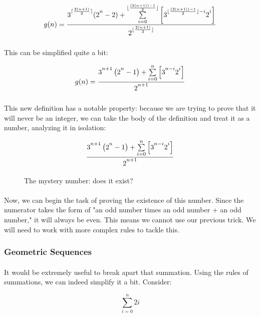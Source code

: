 \documentclass[12pt,letterpaper]{article}
\begin{document}
			\begin{equation*}
				g(n) = \frac{3\strut^{\lceil \frac{2(n + 1)}{2} \rceil} (2\strut^n - 2) + 
					\sum\limits_{i=0}^
					{\lfloor \frac{(2(n + 1))-1}{2} \rfloor} 
					\left[
					3\strut^{\lfloor \frac{(2(n + 1))-1}{2} \rfloor - i}
					2\strut^i 
					\right]}
				{2\strut^{\lfloor \frac{2(n + 1)}{2} \rfloor}}
			\end{equation*}
			
			\paragraph{} This can be simplified quite a bit:
				
			\begin{equation*}
				g(n) =
				\frac{3\strut^{n+1}\left(2\strut^n - 1\right) + 
				\sum\limits_{i=0}^{n} \left[3\strut^{n-i}2\strut^i\right]}
				{2\strut^{n+1}}
			\end{equation*}
			
			\paragraph{} This new definition has a notable property: because we are trying to prove that it will never be an integer, we can take the body of the definition and treat it as a number, analyzing it in isolation:
			
			\begin{figure}[h]
				\begin{equation*}
				\frac{3\strut^{n+1}\left(2\strut^n - 1\right) + 
					\sum\limits_{i=0}^{n} \left[3\strut^{n-i}2\strut^i\right]}
				{2\strut^{n+1}}
				\end{equation*}
				
				\caption{The mystery number: does it exist?}
			\end{figure}
			\newpage %
			
			\paragraph{} Now, we can begin the task of proving the existence of this number. Since the numerator takes the form of "an odd number times an odd number + an odd number," it will always be even. This means we cannot use our previous trick. We will need to work with more complex rules to tackle this.
			
		\subsubsection{Geometric Sequences}
			
			\paragraph{} It would be extremely useful to break apart that summation. Using the rules of summations, we can indeed simplify it a bit. Consider:
			
			\begin{equation*}
				\sum\limits_{i=0}^n 2i
			\end{equation*}
			
			\paragraph{} 
			
			
			
			
			
						
		
\end{document}

